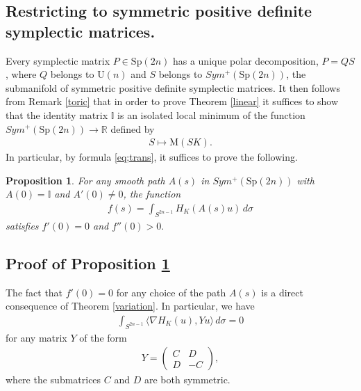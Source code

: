\documentclass[12pt]{amsart}
\newtheorem{proposition}[theorem]{Proposition}
\theoremstyle{definition}
\newcommand{\II}{{\mathbb I}}
\newcommand{\RR}{{\mathbb R}}
\newcommand{\mw}{{{\mathrm {M}}}}
\begin{document}
\subsection{Restricting to symmetric positive definite symplectic matrices.} Every symplectic matrix $P \in \mathrm{Sp}(2n)$ has a unique polar decomposition, $P = QS$, 
where $Q$ belongs to $\mathrm{U}(n)$ and $S$ belongs to $Sym^+(\mathrm{Sp}(2n))$, the submanifold of symmetric positive definite symplectic matrices. It then follows from Remark \ref{toric} that in order to prove Theorem \ref{linear} it suffices to show that the identity matrix  $\II $  is an isolated  local minimum of the function $Sym^+(\mathrm{Sp}(2n)) \to \RR$ defined by 
\begin{align*}
S \mapsto \mw(SK).
\end{align*}
In particular, by formula \eqref{eq;trans}, it suffices to prove the following.

\begin{proposition}\label{prop:lin}
    For any smooth path $A(s)$ in $Sym^+(\mathrm{Sp}(2n))$ with $A(0)=\II$ and $A'(0) \neq 0$, the function
    \begin{align}\label{eq:calc}
        f(s) = \int_{S^{2n-1}} H_K(A(s)u) \, d\sigma
    \end{align}
    satisfies $f'(0) =0$ and $f''(0) >0.$
\end{proposition}

\subsection{Proof of Proposition \ref{prop:lin}}

The fact that $f'(0) =0$  for any choice of the path $A(s)$ is a direct consequence of Theorem \ref{variation}. In particular, we have
\begin{align}\label{eq:zero}
    \int_{S^{2n-1}} \langle \nabla H_K(u), Y u \rangle \, d\sigma =0
\end{align}
for any matrix $Y$ of the form  
\begin{align*}
    Y = \begin{pmatrix}
    C & D\\
    D & -C
    \end{pmatrix}, 
\end{align*}
where the submatrices $C$ and $D$ are both symmetric.

\end{document}

